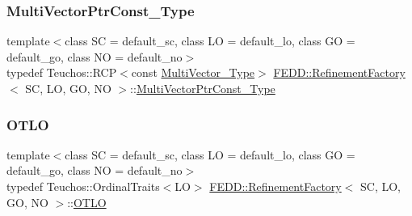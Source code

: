 \mbox{\label{classFEDD_1_1RefinementFactory_af904cdbfa726de22dcea9dfcc891114b}} 
\subsubsection{\texorpdfstring{Multi\+Vector\+Ptr\+Const\+\_\+\+Type}{MultiVectorPtrConst\_Type}}
{\footnotesize\ttfamily template$<$class SC = default\+\_\+sc, class LO = default\+\_\+lo, class GO = default\+\_\+go, class NO = default\+\_\+no$>$ \\
typedef Teuchos\+::\+R\+CP$<$const \hyperlink{classFEDD_1_1RefinementFactory_af7c4cb285d95e61820d63b9344a90976}{Multi\+Vector\+\_\+\+Type}$>$ \hyperlink{classFEDD_1_1RefinementFactory}{F\+E\+D\+D\+::\+Refinement\+Factory}$<$ SC, LO, GO, NO $>$\+::\hyperlink{classFEDD_1_1RefinementFactory_af904cdbfa726de22dcea9dfcc891114b}{Multi\+Vector\+Ptr\+Const\+\_\+\+Type}}

\mbox{\label{classFEDD_1_1RefinementFactory_a266b4b5a15cabb39df492db6e4f53e3e}} 
\subsubsection{\texorpdfstring{O\+T\+LO}{OTLO}}
{\footnotesize\ttfamily template$<$class SC = default\+\_\+sc, class LO = default\+\_\+lo, class GO = default\+\_\+go, class NO = default\+\_\+no$>$ \\
typedef Teuchos\+::\+Ordinal\+Traits$<$LO$>$ \hyperlink{classFEDD_1_1RefinementFactory}{F\+E\+D\+D\+::\+Refinement\+Factory}$<$ SC, LO, GO, NO $>$\+::\hyperlink{classFEDD_1_1RefinementFactory_a266b4b5a15cabb39df492db6e4f53e3e}{O\+T\+LO}}

\mbox{\label{classFEDD_1_1RefinementFactory_ac050bc27156fc5a1e8bf0e01381c33c4}} 
